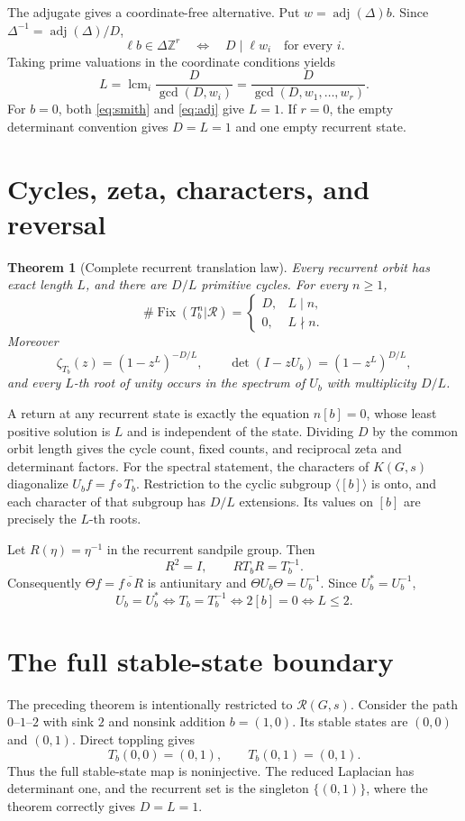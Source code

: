 \documentclass[10pt]{article}
\newtheorem{theorem}{Theorem}
\begin{document}
The adjugate gives a coordinate-free alternative. Put
$w=\operatorname{adj}(\Delta)b$. Since
$\Delta^{-1}=\operatorname{adj}(\Delta)/D$,
\[
\ell b\in\Delta\mathbb Z^r
\quad\Longleftrightarrow\quad
D\mid\ell w_i\quad\text{for every }i.
\]
Taking prime valuations in the coordinate conditions yields
\begin{equation}\label{eq:adj}
L=\operatorname{lcm}_{i}\frac{D}{\gcd(D,w_i)}
=\frac{D}{\gcd(D,w_1,\ldots,w_r)}.
\end{equation}
For $b=0$, both \eqref{eq:smith} and \eqref{eq:adj} give $L=1$. If $r=0$,
the empty determinant convention gives $D=L=1$ and one empty recurrent state.

\section{Cycles, zeta, characters, and reversal}
\begin{theorem}[Complete recurrent translation law]
Every recurrent orbit has exact length $L$, and there are $D/L$ primitive
cycles. For every $n\ge1$,
\[
\#\operatorname{Fix}(T_b^n|\mathcal R)=
\begin{cases}D,&L\mid n,\\0,&L\nmid n.\end{cases}
\]
Moreover
\[
\zeta_{T_b}(z)=(1-z^L)^{-D/L},\qquad
\det(I-zU_b)=(1-z^L)^{D/L},
\]
and every $L$-th root of unity occurs in the spectrum of $U_b$ with
multiplicity $D/L$.
\end{theorem}

A return at any recurrent state is exactly the equation $n[b]=0$, whose least
positive solution is $L$ and is independent of the state. Dividing $D$ by the
common orbit length gives the cycle count, fixed counts, and reciprocal zeta
and determinant factors. For the spectral statement, the characters of
$K(G,s)$ diagonalize $U_bf=f\circ T_b$. Restriction to the cyclic subgroup
$\langle[b]\rangle$ is onto, and each character of that subgroup has $D/L$
extensions. Its values on $[b]$ are precisely the $L$-th roots.

Let $R(\eta)=\eta^{-1}$ in the recurrent sandpile group. Then
\[
R^2=I,\qquad RT_bR=T_b^{-1}.
\]
Consequently $\Theta f=\overline{f\circ R}$ is antiunitary and
$\Theta U_b\Theta=U_b^{-1}$. Since $U_b^*=U_b^{-1}$,
\[
U_b=U_b^*\Longleftrightarrow T_b=T_b^{-1}
\Longleftrightarrow 2[b]=0
\Longleftrightarrow L\le2.
\]

\section{The full stable-state boundary}
The preceding theorem is intentionally restricted to $\mathcal R(G,s)$.
Consider the path $0$--$1$--$2$ with sink $2$ and nonsink addition
$b=(1,0)$. Its stable states are $(0,0)$ and $(0,1)$. Direct toppling gives
\[
T_b(0,0)=(0,1),\qquad T_b(0,1)=(0,1).
\]
Thus the full stable-state map is noninjective. The reduced Laplacian has
determinant one, and the recurrent set is the singleton $\{(0,1)\}$, where
the theorem correctly gives $D=L=1$.
\end{document}
